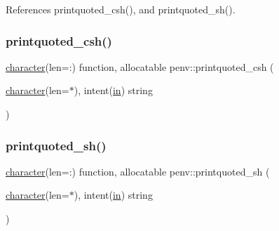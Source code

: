 References printquoted\+\_\+csh(), and printquoted\+\_\+sh().

\mbox{\label{penv_8f90_a8352a8cad3a618a85c981f11beb23715}} 
\subsubsection{\texorpdfstring{printquoted\+\_\+csh()}{printquoted\_csh()}}
{\footnotesize\ttfamily \hyperlink{option__stopwatch_83_8txt_abd4b21fbbd175834027b5224bfe97e66}{character}(len=\+:) function, allocatable penv\+::printquoted\+\_\+csh (\begin{DoxyParamCaption}\item[{\hyperlink{option__stopwatch_83_8txt_abd4b21fbbd175834027b5224bfe97e66}{character}(len=$\ast$), intent(\hyperlink{M__journal_83_8txt_afce72651d1eed785a2132bee863b2f38}{in})}]{string }\end{DoxyParamCaption})}

\mbox{\label{penv_8f90_a446969c8690f5c32006cd0ae899ce932}} 
\subsubsection{\texorpdfstring{printquoted\+\_\+sh()}{printquoted\_sh()}}
{\footnotesize\ttfamily \hyperlink{option__stopwatch_83_8txt_abd4b21fbbd175834027b5224bfe97e66}{character}(len=\+:) function, allocatable penv\+::printquoted\+\_\+sh (\begin{DoxyParamCaption}\item[{\hyperlink{option__stopwatch_83_8txt_abd4b21fbbd175834027b5224bfe97e66}{character}(len=$\ast$), intent(\hyperlink{M__journal_83_8txt_afce72651d1eed785a2132bee863b2f38}{in})}]{string }\end{DoxyParamCaption})}

